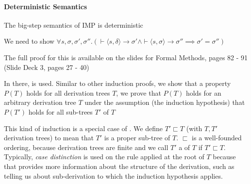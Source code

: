 \paragraph{Deterministic Semantics}
\inlinelemma The big-step semantics of IMP is deterministic

\inlineproof We need to show $\forall s, \sigma, \sigma', \sigma''.
    (\vdash \langle s, \delta \rangle \rightarrow \sigma' \land \vdash \langle s, \sigma \rangle \rightarrow \sigma'' \implies \sigma' = \sigma'')$

The full proof for this is available on the slides for Formal Methods, pages 82 - 91 (Slide Deck 3, pages 27 - 40)

In there,  is used.
Similar to other induction proofs, we show that a property $P(T)$ holds for all derivation trees $T$,
we prove that $P(T)$ holds for an arbitrary derivation tree $T$ under the assumption (the induction hypothesis) that $P(T')$ holds for all sub-trees $T'$ of $T$

This kind of induction is a special case of .
We define $T' \sqsubset T$ (with $T, T'$ derivation trees) to mean that $T'$ is a proper sub-tree of $T$. 
$\sqsubset$ is a well-founded ordering, because derivation trees are finite and we call $T'$ a  of $T$ if $T' \sqsubset T$.
Typically, \textit{case distinction} is used on the rule applied at the root of $T$ because that provides more information about the structure of the derivation,
such as telling us about sub-derivation to which the induction hypothesis applies.
